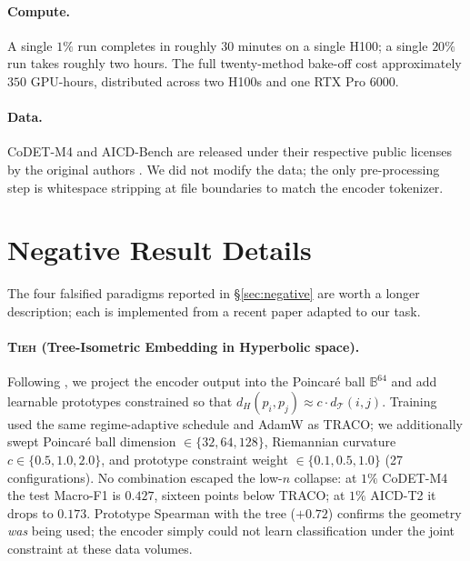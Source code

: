 ﻿\documentclass[11pt]{article}
\newcommand{\method}{\textsc{TRACO}\xspace}
\begin{document}
\paragraph{Compute.} A single $1\%$ run completes in roughly $30$
minutes on a single H100; a single $20\%$ run takes roughly two
hours. The full twenty-method bake-off cost approximately
$350$ GPU-hours, distributed across two H100s and one RTX Pro 6000.

\paragraph{Data.} CoDET-M4 and AICD-Bench are released under their
respective public licenses by the original authors
\citep{orel2025codetm4, orel2026aicd}. We did not modify the
data; the only pre-processing step is whitespace stripping at file
boundaries to match the encoder tokenizer.

\section{Negative Result Details}
\label{app:negative}

The four falsified paradigms reported in \S\ref{sec:negative} are
worth a longer description; each is implemented from a recent paper
adapted to our task.

\paragraph{\textsc{Tieh} (Tree-Isometric Embedding in Hyperbolic
space).} Following \citet{nickel2017poincare}, we project the
encoder output into the Poincar\'e ball $\mathbb{B}^{64}$ and add
learnable prototypes constrained so that $d_H(p_i, p_j) \approx
c \cdot d_{\mathcal{T}}(i, j)$. Training used the same
regime-adaptive schedule and AdamW as \method; we additionally swept
Poincar\'e ball dimension $\in \{32, 64, 128\}$, Riemannian curvature
$c \in \{0.5, 1.0, 2.0\}$, and prototype constraint weight
$\in \{0.1, 0.5, 1.0\}$ (27 configurations). No combination escaped
the low-$n$ collapse: at $1\%$ CoDET-M4 the test Macro-F1 is $0.427$,
sixteen points below \method; at $1\%$ AICD-T2 it drops to $0.173$.
Prototype Spearman with the tree ($+0.72$) confirms the geometry
\emph{was} being used; the encoder simply could not learn
classification under the joint constraint at these data volumes.
\end{document}

